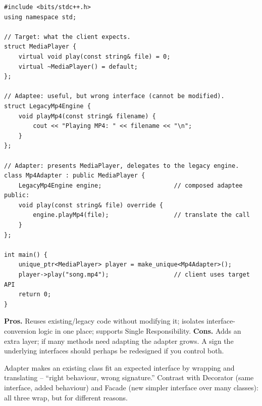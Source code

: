 \begin{lstlisting}
#include <bits/stdc++.h>
using namespace std;

// Target: what the client expects.
struct MediaPlayer {
    virtual void play(const string& file) = 0;
    virtual ~MediaPlayer() = default;
};

// Adaptee: useful, but wrong interface (cannot be modified).
struct LegacyMp4Engine {
    void playMp4(const string& filename) {
        cout << "Playing MP4: " << filename << "\n";
    }
};

// Adapter: presents MediaPlayer, delegates to the legacy engine.
class Mp4Adapter : public MediaPlayer {
    LegacyMp4Engine engine;                    // composed adaptee
public:
    void play(const string& file) override {
        engine.playMp4(file);                  // translate the call
    }
};

int main() {
    unique_ptr<MediaPlayer> player = make_unique<Mp4Adapter>();
    player->play("song.mp4");                  // client uses target API
    return 0;
}
\end{lstlisting}

\begin{complexitybox}
\textbf{Pros.} Reuses existing/legacy code without modifying it; isolates
interface-conversion logic in one place; supports Single Responsibility.
\textbf{Cons.} Adds an extra layer; if many methods need adapting the
adapter grows. A sign the underlying interfaces should perhaps be
redesigned if you control both.
\end{complexitybox}

\begin{takeawaybox}
Adapter makes an existing class fit an expected interface by wrapping and
translating -- ``right behaviour, wrong signature.'' Contrast with
Decorator (same interface, added behaviour) and Facade (new simpler
interface over many classes): all three wrap, but for different reasons.
\end{takeawaybox}
